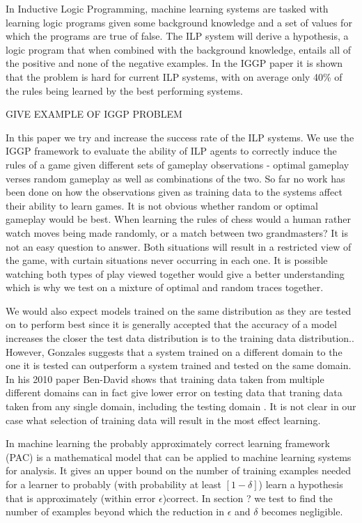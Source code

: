 \documentclass[a4paper,12pt]{report}
\begin{document}
In Inductive Logic Programming, machine learning systems are tasked with learning logic programs given some background knowledge and a set of values for which the programs are true of false. The ILP system will derive a hypothesis, a logic program that when combined with the background knowledge, entails all of the positive and none of the negative examples\cite{Muggleton/ILP}. In the IGGP paper it is shown that the problem is hard for current ILP systems, with on average only 40\% of the rules being learned by the best performing systems.

GIVE EXAMPLE OF IGGP PROBLEM

In this paper we try and increase the success rate of the ILP systems. We use the IGGP framework to evaluate the ability of ILP agents to correctly induce the rules of a game given different sets of gameplay observations - optimal gameplay verses random gameplay as well as combinations of the two. So far no work has been done on how the observations given as training data to the systems affect their ability to learn games. It is not obvious whether random or optimal gameplay would be best. When learning the rules of chess would a human rather watch moves being made randomly, or a match between two grandmasters? It is not an easy question to answer. Both situations will result in a restricted view of the game, with curtain situations never occurring in each one. It is possible watching both types of play viewed together would give a better understanding which is why we test on a mixture of optimal and random traces together.

We would also expect models trained on the same distribution as they are tested on to perform best since it is generally accepted that the accuracy of a model increases the closer the test data distribution is to the training data distribution.\cite{Mitchell/MachineLearing}. However, Gonzales \cite{Gonzalez/MismatchedOutperform} suggests that a system trained on a different domain to the one it is tested can outperform a system trained and tested on the same domain. In his 2010 paper Ben-David shows that training data taken from multiple different domains can in fact give lower error on testing data that traning data taken from any single domain, including the testing domain \cite{Ben-David/DifferentDomains}. It is not clear in our case what selection of training data will result in the most effect learning.

In machine learning the probably approximately correct learning framework (PAC) is a mathematical model that can be applied to machine learning systems for analysis. It gives an upper bound on the number of training examples needed for a learner to probably (with probability at least $[1-\delta]$) learn a hypothesis that is approximately (within error $\epsilon$)correct\cite{Mitchell/MachineLearing}. In section ? we test to find the number of examples beyond which the reduction in $\epsilon$ and $\delta$ becomes negligible.
\end{document}
